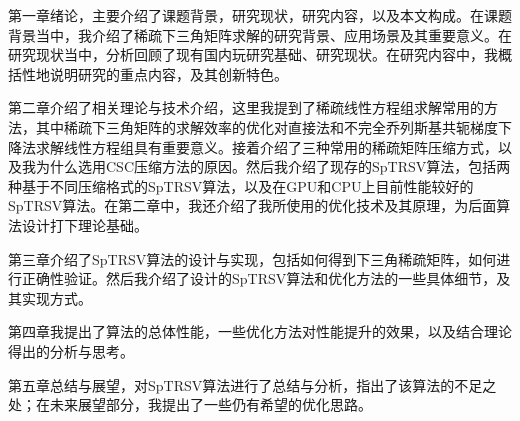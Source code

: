 第一章绪论，主要介绍了课题背景，研究现状，研究内容，以及本文构成。在课题背景当中，我介绍了稀疏下三角矩阵求解的研究背景、应用场景及其重要意义。在研究现状当中，分析回顾了现有国内玩研究基础、研究现状。在研究内容中，我概括性地说明研究的重点内容，及其创新特色。

第二章介绍了相关理论与技术介绍，这里我提到了稀疏线性方程组求解常用的方法，其中稀疏下三角矩阵的求解效率的优化对直接法和不完全乔列斯基共轭梯度下降法求解线性方程组具有重要意义。接着介绍了三种常用的稀疏矩阵压缩方式，以及我为什么选用CSC压缩方法的原因。然后我介绍了现存的SpTRSV算法，包括两种基于不同压缩格式的SpTRSV算法，以及在GPU和CPU上目前性能较好的SpTRSV算法。在第二章中，我还介绍了我所使用的优化技术及其原理，为后面算法设计打下理论基础。

第三章介绍了SpTRSV算法的设计与实现，包括如何得到下三角稀疏矩阵，如何进行正确性验证。然后我介绍了设计的SpTRSV算法和优化方法的一些具体细节，及其实现方式。

第四章我提出了算法的总体性能，一些优化方法对性能提升的效果，以及结合理论得出的分析与思考。

第五章总结与展望，对SpTRSV算法进行了总结与分析，指出了该算法的不足之处；在未来展望部分，我提出了一些仍有希望的优化思路。

\endinput
